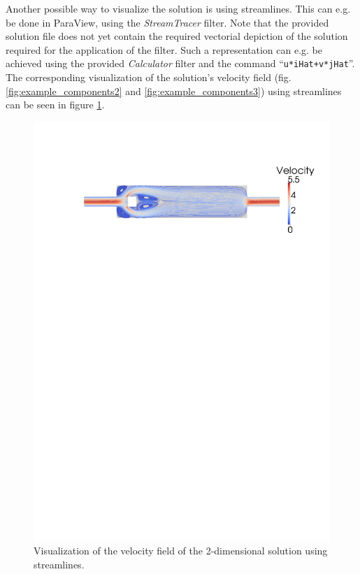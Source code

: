 \documentclass{article}
\begin{document}
Another possible way to visualize the solution is using streamlines. This can e.g. be done in ParaView, using the \emph{StreamTracer} filter. Note that the provided solution file does not yet contain the required vectorial depiction of the solution required for the application of the filter. Such a representation can e.g. be achieved using the provided \emph{Calculator} filter and the command ``\texttt{u*iHat+v*jHat}''.\\
The corresponding visualization of the solution's velocity field (fig. \ref{fig:example_components2} and \ref{fig:example_components3}) using streamlines can be seen in figure \ref{fig:2d2}.
\vspace*{30pt}
\begin{figure}[hb]
    \includegraphics[width=\textwidth,trim=3cm 22cm 3cm 4cm, clip=true]{fig/2d_stream.pdf}
\caption{Visualization of the velocity field of the 2-dimensional solution using streamlines.}\label{fig:2d2}
\end{figure}
\end{document}
